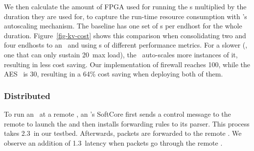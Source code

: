 We then calculate the amount of FPGA used for running the \nt{}s multiplied by the duration they are used for, to capture the run-time resource consumption with \snic's autoscaling mechanism. The baseline has one set of \nt{}s per endhost for the whole duration.
Figure~\ref{fig-kv-cost} shows this comparison when consolidating two and four endhosts to an \snic\ and using \nt{}s of different performance metrics.
For a slower \nt{} (\eg, one that can only sustain 20\Gbps\ max load), the \snic\ auto-scales more instances of it, resulting in less cost saving.
Our implementation of firewall \nt{} reaches 100\Gbps, while the AES \nt\ is 30\Gbps, resulting in a 64\% cost saving when deploying both of them.




\subsubsection{Distributed \snic{}}
To run an \nt\ at a remote \snic,
an \snic{}'s SoftCore first sends a control message to the remote \snic{} to launch the \nt{} and then installs forwarding rules to its parser. This process takes 2.3\mus\ in our testbed.
Afterwards, packets are forwarded to the remote \snic. We observe an addition of 1.3\mus\ latency when packets go through the remote \snic.
\fi
